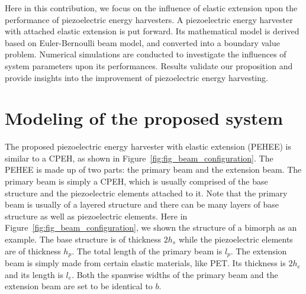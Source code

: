 \documentclass{elsarticle}
\begin{document}
Here in this contribution, we focus on the influence of elastic extension upon the performance of piezoelectric energy harvesters. A piezoelectric energy harvester with attached elastic extension is put forward. Its mathematical model is derived based on Euler-Bernoulli beam model, and converted into a boundary value problem. Numerical simulations are conducted to investigate the influences of system parameters upon its performances. Results validate our proposition and provide insights into the improvement of piezoelectric energy harvesting. 


\section{Modeling of the proposed system}

The proposed piezoelectric energy harvester with elastic extension (PEHEE) is similar to a CPEH, as shown in Figure~\ref{fig:fig_beam_configuration}. The PEHEE is made up of two parts: the primary beam and the extension beam. The primary beam is simply a CPEH, which is usually comprised of the base structure and the piezoelectric elements attached to it. Note that the primary beam is usually of a layered structure and there can be many layers of base structure as well as piezoelectric elements. Here in Figure~\ref{fig:fig_beam_configuration}, we shown the structure of a bimorph as an example. The base structure is of thickness $2h_s$ while the piezoelectric elements are of thickness $h_p$. The total length of the primary beam is $l_p$. The extension beam is simply made from certain elastic materials, like PET. Its thickness is $2h_e$ and its length is $l_e$. Both the spanwise widths of the primary beam and the extension beam are set to be identical to $b$.
\end{document}
